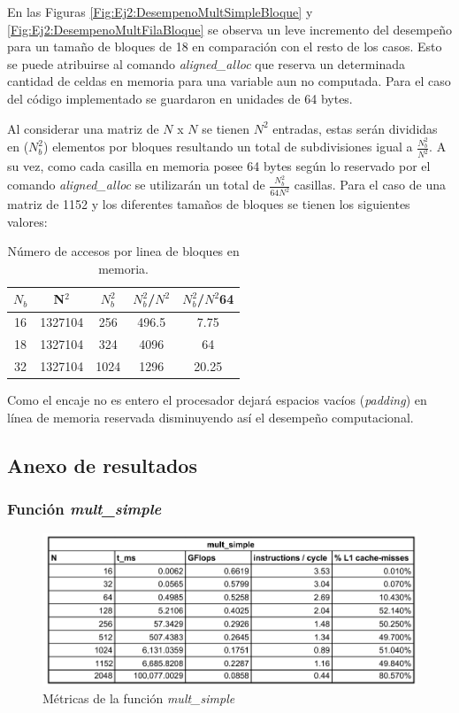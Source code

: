 \documentclass[11pt]{article}
\begin{document}
En las Figuras \ref{Fig:Ej2:DesempenoMultSimpleBloque} y \ref{Fig:Ej2:DesempenoMultFilaBloque} se observa un leve incremento del desempeño para un tamaño de bloques de 18 en comparación con el resto de los casos. Esto se puede atribuirse al comando \emph{aligned\_alloc} que reserva un determinada cantidad de celdas en memoria para una variable aun no computada. Para el caso del código implementado se guardaron en unidades de 64 bytes.

Al considerar una matriz de $N$ x $N$ se tienen $N^2$ entradas, estas serán divididas en  ($N_b^2$) elementos por bloques resultando un total de subdivisiones igual a $\frac{N_b^2}{N^2}$. A su vez, como cada casilla en memoria posee 64 bytes según lo reservado por el comando  \emph{aligned\_alloc} se utilizarán un total de $\frac{N_b^2}{64N^2}$ casillas. Para el caso de una matriz de 1152 y los diferentes tamaños de bloques se tienen los siguientes valores:
\newpage
\begin{table}[h]
    \centering
    \begin{tabular}{||c|c|c|c|c||}
        \hline
           $N_b$  & N$^2$ & $N_b^2$ &$ N_b^2$/$N^2$ & $N_b^2$/$N^2$64\\[0.5ex]  \hline\hline
          16    & 1327104   & 256  &496.5 & 7.75\\ \hline
          18    & 1327104   & 324  &4096  & 64 \\ \hline
          32    & 1327104   & 1024 & 1296 & 20.25\\ \hline
    \end{tabular}
    \caption{Número de accesos por linea de bloques en memoria.}
    \label{Tab:Ej2:Nmax}
\end{table}

Como el encaje no es entero el procesador dejará espacios vacíos (\emph{padding}) en línea de memoria reservada disminuyendo así el desempeño computacional.



\newpage
\subsection*{Anexo de resultados}\label{Anexo}
\subsubsection*{Función \emph{mult\_simple}}
\begin{figure}[h]
    \centering
    \includegraphics[width=.7\textwidth]{t_mul_simple.pdf}
    \caption{Métricas de la función \emph{mult\_simple}}
    \label{Fig:Ej2:mult_simple}
\end{figure}
\end{document}
